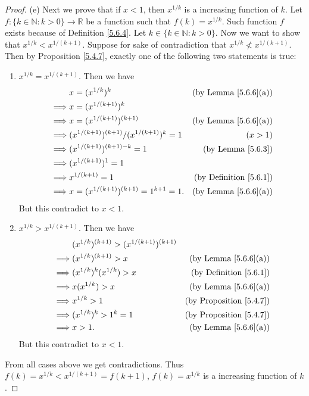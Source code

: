 \begin{proof}{(e)}
Next we prove that if \(x < 1\), then \(x^{1 / k}\) is a increasing function of \(k\).
Let \(f : \{k \in \mathds{N} : k > 0\} \to \mathds{R}\) be a function such that \(f(k) = x^{1 / k}\).
Such function \(f\) exists because of Definition \ref{5.6.4}.
Let \(k \in \{k \in \mathds{N} : k > 0\}\).
Now we want to show that \(x^{1 / k} < x^{1 / (k + 1)}\).
Suppose for sake of contradiction that \(x^{1 / k} \not< x^{1 / (k + 1)}\).
Then by Proposition \ref{5.4.7}, exactly one of the following two statements is true:
\begin{enumerate}[label=(\Roman*)]
    \item \(x^{1 / k} = x^{1 / (k + 1)}\).
    Then we have
    \begin{align*}
        & x = (x^{1 / k})^k & \text{(by Lemma \ref{5.6.6}(a))} \\
        \implies & x = (x^{1 / (k + 1)})^k \\
        \implies & x = (x^{1 / (k + 1)})^{(k + 1)} & \text{(by Lemma \ref{5.6.6}(a))} \\
        \implies & (x^{1 / (k + 1)})^{(k + 1)} / (x^{1 / (k + 1)})^k = 1 & (x > 1) \\
        \implies & (x^{1 / (k + 1)})^{(k + 1) - k} = 1 & \text{(by Lemma \ref{5.6.3})} \\
        \implies & (x^{1 / (k + 1)})^1 = 1 \\
        \implies & x^{1 / (k + 1)} = 1 & \text{(by Definition \ref{5.6.1})} \\
        \implies & x = (x^{1 / (k + 1)})^{(k + 1)} = 1^{k + 1} = 1. & \text{(by Lemma \ref{5.6.6}(a))}
    \end{align*}
    But this contradict to \(x < 1\).
    \item \(x^{1 / k} > x^{1 / (k + 1)}\).
    Then we have
    \begin{align*}
        & (x^{1 / k})^{(k + 1)} > (x^{1 / (k + 1)})^{(k + 1)} \\
        \implies & (x^{1 / k})^{(k + 1)} > x & \text{(by Lemma \ref{5.6.6}(a))} \\
        \implies & (x^{1 / k})^k (x^{1 / k}) > x & \text{(by Definition \ref{5.6.1})} \\
        \implies & x (x^{1 / k}) > x & \text{(by Lemma \ref{5.6.6}(a))} \\
        \implies & x^{1 / k} > 1 & \text{(by Proposition \ref{5.4.7})} \\
        \implies & (x^{1 / k})^k > 1^k = 1 & \text{(by Proposition \ref{5.4.7})} \\
        \implies & x > 1. & \text{(by Lemma \ref{5.6.6}(a))}
    \end{align*}
    But this contradict to \(x < 1\).
\end{enumerate}
From all cases above we get contradictions.
Thus \(f(k) = x^{1 / k} < x^{1 / (k + 1)} = f(k + 1)\), \(f(k) = x^{1 / k}\) is a increasing function of \(k\).


\end{proof}
